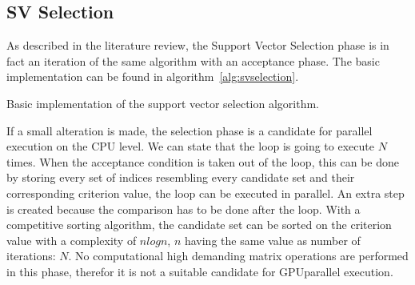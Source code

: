 \subsection{SV Selection}
As described in the literature review, the Support Vector Selection phase is in fact an iteration of the same algorithm with an acceptance phase.
The basic implementation can be found in algorithm~\ref{alg:svselection}.
\begin{algorithm}
	\caption{Basic implementation of the support vector selection algorithm.}
	\label{alg:svselection}
\end{algorithm}
If a small alteration is made, the selection phase is a candidate for parallel execution on the CPU level.
We can state that the loop is going to execute $N$ times.
When the acceptance condition is taken out of the loop, this can be done by storing every set of indices resembling every candidate set and their corresponding criterion value, the loop can be executed in parallel.
An extra step is created because the comparison has to be done after the loop.
With a competitive sorting algorithm, the candidate set can be sorted on the criterion value with a complexity of $nlogn$, $n$ having the same value as number of iterations: $N$.
No computational high demanding matrix operations are performed in this phase, therefor it is not a suitable candidate for GPUparallel execution.
